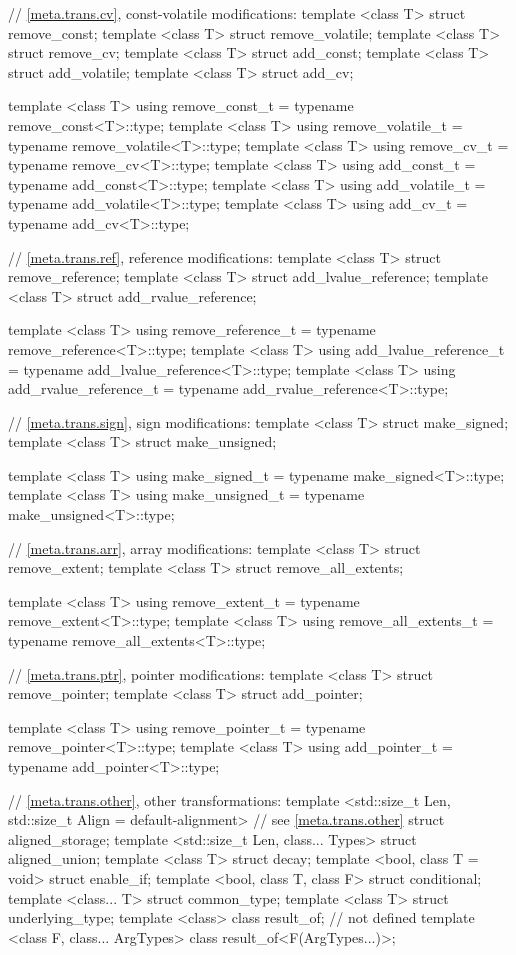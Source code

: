 \begin{codeblock}
{  // \ref{meta.trans.cv}, const-volatile modifications:
  template <class T> struct remove_const;
  template <class T> struct remove_volatile;
  template <class T> struct remove_cv;
  template <class T> struct add_const;
  template <class T> struct add_volatile;
  template <class T> struct add_cv;

  template <class T>
    using remove_const_t    = typename remove_const<T>::type;
  template <class T>
    using remove_volatile_t = typename remove_volatile<T>::type;
  template <class T>
    using remove_cv_t       = typename remove_cv<T>::type;
  template <class T>
    using add_const_t       = typename add_const<T>::type;
  template <class T>
    using add_volatile_t    = typename add_volatile<T>::type;
  template <class T>
    using add_cv_t          = typename add_cv<T>::type;

  // \ref{meta.trans.ref}, reference modifications:
  template <class T> struct remove_reference;
  template <class T> struct add_lvalue_reference;
  template <class T> struct add_rvalue_reference;

  template <class T>
    using remove_reference_t     = typename remove_reference<T>::type;
  template <class T>
    using add_lvalue_reference_t = typename add_lvalue_reference<T>::type;
  template <class T>
    using add_rvalue_reference_t = typename add_rvalue_reference<T>::type;

  // \ref{meta.trans.sign}, sign modifications:
  template <class T> struct make_signed;
  template <class T> struct make_unsigned;

  template <class T>
    using make_signed_t   = typename make_signed<T>::type;
  template <class T>
    using make_unsigned_t = typename make_unsigned<T>::type;

  // \ref{meta.trans.arr}, array modifications:
  template <class T> struct remove_extent;
  template <class T> struct remove_all_extents;

  template <class T>
    using remove_extent_t      = typename remove_extent<T>::type;
  template <class T>
    using remove_all_extents_t = typename remove_all_extents<T>::type;

  // \ref{meta.trans.ptr}, pointer modifications:
  template <class T> struct remove_pointer;
  template <class T> struct add_pointer;

  template <class T>
    using remove_pointer_t = typename remove_pointer<T>::type;
  template <class T>
    using add_pointer_t    = typename add_pointer<T>::type;

  // \ref{meta.trans.other}, other transformations:
  template <std::size_t Len,
            std::size_t Align = default-alignment>   // see \ref{meta.trans.other}
    struct aligned_storage;      
  template <std::size_t Len, class... Types> struct aligned_union;
  template <class T> struct decay;
  template <bool, class T = void> struct enable_if;
  template <bool, class T, class F> struct conditional;
  template <class... T> struct common_type;
  template <class T> struct underlying_type;
  template <class> class result_of;   // not defined
  template <class F, class... ArgTypes> class result_of<F(ArgTypes...)>;

}
\end{codeblock}
